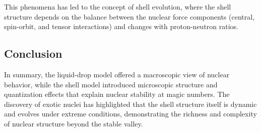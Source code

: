 This phenomena has led to the concept of shell evolution, where the shell structure depends on the balance between the nuclear force components (central, spin-orbit, and tensor interactions) and changes with proton-neutron ratios.

\subsection{Conclusion}

In summary, the liquid-drop model offered a macroscopic view of nuclear behavior, while the shell model introduced microscopic structure and quantization effects that explain nuclear stability at magic numbers. The discovery of exotic nuclei has highlighted that the shell structure itself is dynamic and evolves under extreme conditions, demonstrating the richness and complexity of nuclear structure beyond the stable valley.

%
%

%
%
%
%
%
%
%
